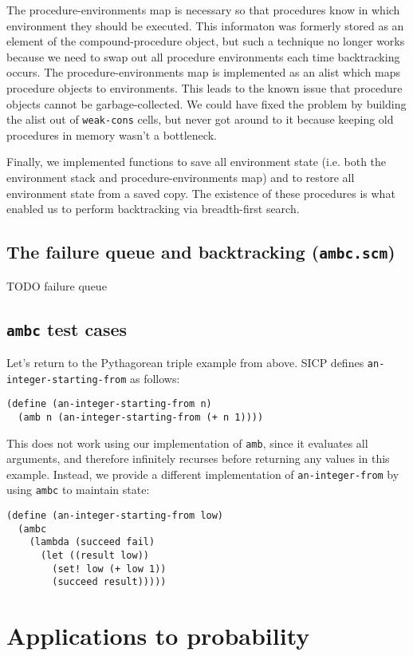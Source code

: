 \documentclass{article}
\begin{document}
The procedure-environments map is necessary so that procedures know in
which environment they should be executed.  This informaton was
formerly stored as an element of the compound-procedure object, but
such a technique no longer works because we need to swap out all
procedure environments each time backtracking occurs.  The
procedure-environments map is implemented as an alist which maps
procedure objects to environments.  This leads to the known issue that
procedure objects cannot be garbage-collected. We could have fixed the
problem by building the alist out of \texttt{weak-cons} cells, but
never got around to it because keeping old procedures in memory wasn't
a bottleneck.

Finally, we implemented functions to save all environment state
(i.e. both the environment stack and procedure-environments map) and
to restore all environment state from a saved copy.  The existence of
these procedures is what enabled us to perform backtracking via
breadth-first search.

\subsection{The failure queue and backtracking (\texttt{ambc.scm})}

TODO failure queue

\subsection{\texttt{ambc} test cases}

Let's return to the Pythagorean triple example from above. SICP defines
\texttt{an-integer-starting-from} as follows:
\begin{lstlisting}
(define (an-integer-starting-from n)
  (amb n (an-integer-starting-from (+ n 1))))
\end{lstlisting}
This does not work using our implementation of \texttt{amb}, since it evaluates
all arguments, and therefore infinitely recurses before returning any values in
this example. Instead, we provide a different implementation of
\texttt{an-integer-from} by using \texttt{ambc} to maintain state:
\begin{lstlisting}
(define (an-integer-starting-from low)
  (ambc
    (lambda (succeed fail)
      (let ((result low))
        (set! low (+ low 1))
        (succeed result)))))
\end{lstlisting}

\section{Applications to probability}
\end{document}
